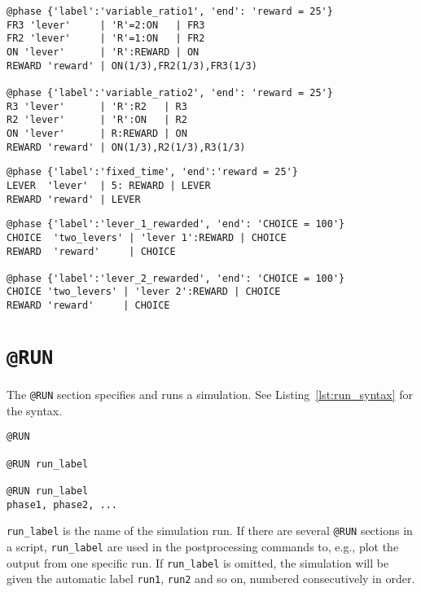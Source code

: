 \documentclass[11pt]{article}
\begin{document}
\begin{lstlisting}[caption={Two equivalent \texttt{@phase} sections for variable ratio}, label=lst:phase_example6]
@phase {'label':'variable_ratio1', 'end': 'reward = 25'}
FR3 'lever'     | 'R'=2:ON   | FR3
FR2 'lever'     | 'R'=1:ON   | FR2
ON 'lever'      | 'R':REWARD | ON
REWARD 'reward' | ON(1/3),FR2(1/3),FR3(1/3) 

@phase {'label':'variable_ratio2', 'end': 'reward = 25'}
R3 'lever'      | 'R':R2   | R3
R2 'lever'      | 'R':ON   | R2
ON 'lever'      | R:REWARD | ON
REWARD 'reward' | ON(1/3),R2(1/3),R3(1/3)  
\end{lstlisting}

\begin{lstlisting}[caption={A \texttt{@phase} section for reward after a fixed time}, label=lst:phase_example7]
@phase {'label':'fixed_time', 'end':'reward = 25'}
LEVER  'lever'  | 5: REWARD | LEVER
REWARD 'reward' | LEVER
\end{lstlisting}

\begin{lstlisting}[caption={A \texttt{@phase} section for reversal learning}, label=lst:phase_example8]
@phase {'label':'lever_1_rewarded', 'end': 'CHOICE = 100'}
CHOICE	'two_levers' | 'lever 1':REWARD | CHOICE
REWARD	'reward'     | CHOICE

@phase {'label':'lever_2_rewarded', 'end': 'CHOICE = 100'}
CHOICE 'two_levers' | 'lever 2':REWARD | CHOICE	
REWARD 'reward'     | CHOICE
\end{lstlisting}


\section{\texttt{@RUN}}
\label{sec:run}
The \verb|@RUN| section specifies and runs a simulation. See Listing~\ref{lst:run_syntax} for the syntax.
\begin{lstlisting}[caption={Syntax for a \texttt{@RUN} section}, label={lst:run_syntax}]
@RUN

@RUN run_label

@RUN run_label
phase1, phase2, ...
\end{lstlisting}
\verb|run_label| is the name of the simulation run. If there are several \verb|@RUN| sections in a script, \verb|run_label| are used in the postprocessing commands to, e.g., plot the output from one specific run. If \verb|run_label| is omitted, the simulation will be given the automatic label \verb|run1|, \verb|run2| and so on, numbered consecutively in order.
\end{document}
